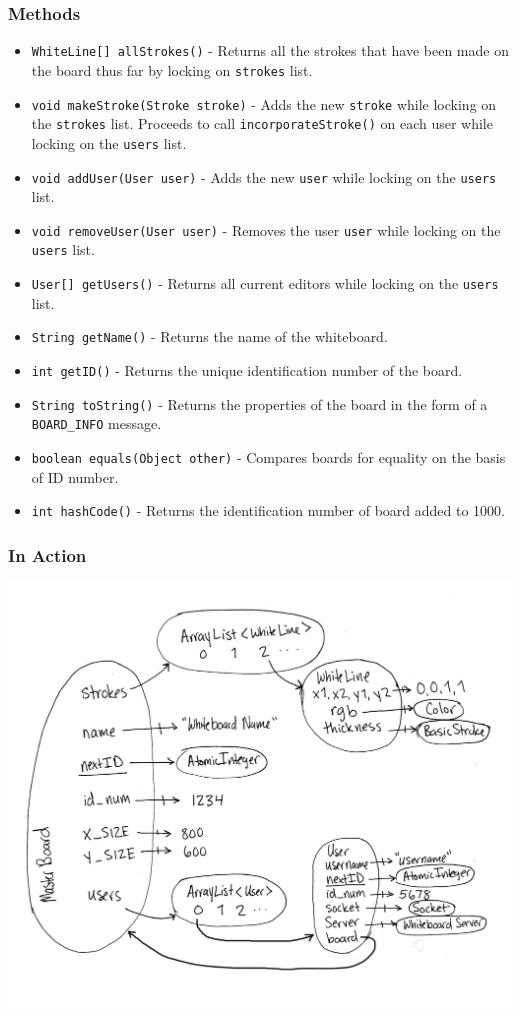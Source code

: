 \subsubsection{Methods}
\begin{itemize}
\item \texttt{WhiteLine[] allStrokes()} - Returns all the strokes that have been made on the board thus far by locking on \texttt{strokes} list.
\item \texttt{void makeStroke(Stroke stroke)} - Adds the new \texttt{stroke} while locking on the \texttt{strokes} list. Proceeds to call \texttt{incorporateStroke()} on each user while locking on the \texttt{users} list.
\item \texttt{void addUser(User user)} - Adds the new \texttt{user} while locking on the \texttt{users} list.
\item \texttt{void removeUser(User user)} - Removes the user \texttt{user} while locking on the \texttt{users} list.
\item \texttt{User[] getUsers()} - Returns all current editors while locking on the \texttt{users} list.
\item \texttt{String getName()} - Returns the name of the whiteboard.
\item \texttt{int getID()} - Returns the unique identification number of the board.
\item \texttt{String toString()} - Returns the properties of the board in the form of a \texttt{BOARD\_INFO} message.
\item \texttt{boolean equals(Object other)} - Compares boards for equality on the basis of ID number.
\item \texttt{int hashCode()} - Returns the identification number of board added to 1000.
\end{itemize}

\subsubsection{In Action}
\includegraphics[keepaspectratio=1,width=6in]{img/wb-snapshot.jpg}


